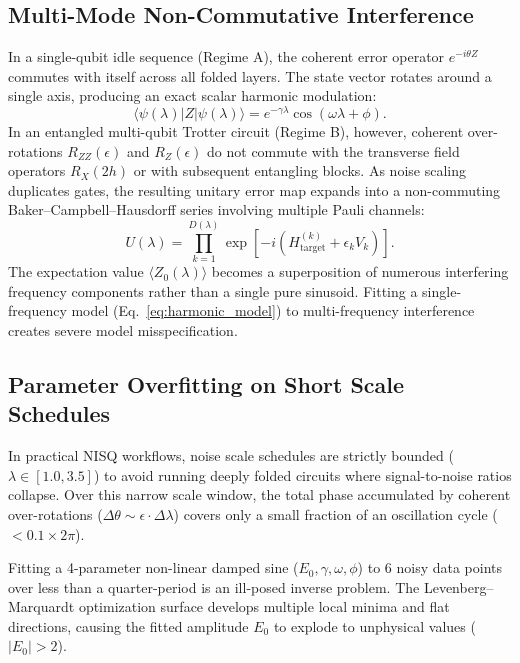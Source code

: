 \documentclass[10pt,twocolumn,a4paper]{article}
\begin{document}
\subsection{Multi-Mode Non-Commutative Interference}
In a single-qubit idle sequence (Regime A), the coherent error operator $e^{-i \theta Z}$ commutes with itself across all folded layers. The state vector rotates around a single axis, producing an exact scalar harmonic modulation:
\begin{equation}
\langle \psi(\lambda) | Z | \psi(\lambda) \rangle = e^{-\gamma \lambda} \cos(\omega \lambda + \phi).
\end{equation}
In an entangled multi-qubit Trotter circuit (Regime B), however, coherent over-rotations $R_{ZZ}(\epsilon)$ and $R_Z(\epsilon)$ do not commute with the transverse field operators $R_X(2h)$ or with subsequent entangling blocks. As noise scaling duplicates gates, the resulting unitary error map expands into a non-commuting Baker--Campbell--Hausdorff series involving multiple Pauli channels:
\begin{equation}
U(\lambda) = \prod_{k=1}^{D(\lambda)} \exp\left[ -i \left( H_{\mathrm{target}}^{(k)} + \epsilon_k V_k \right) \right].
\end{equation}
The expectation value $\langle Z_0(\lambda) \rangle$ becomes a superposition of numerous interfering frequency components rather than a single pure sinusoid. Fitting a single-frequency model (Eq.~\ref{eq:harmonic_model}) to multi-frequency interference creates severe model misspecification.

\subsection{Parameter Overfitting on Short Scale Schedules}
In practical NISQ workflows, noise scale schedules are strictly bounded ($\lambda \in [1.0, 3.5]$) to avoid running deeply folded circuits where signal-to-noise ratios collapse. Over this narrow scale window, the total phase accumulated by coherent over-rotations ($\Delta \theta \sim \epsilon \cdot \Delta \lambda$) covers only a small fraction of an oscillation cycle ($< 0.1\times 2\pi$). 

Fitting a 4-parameter non-linear damped sine ($E_0, \gamma, \omega, \phi$) to 6 noisy data points over less than a quarter-period is an ill-posed inverse problem. The Levenberg--Marquardt optimization surface develops multiple local minima and flat directions, causing the fitted amplitude $E_0$ to explode to unphysical values ($|E_0| > 2$).
\end{document}

